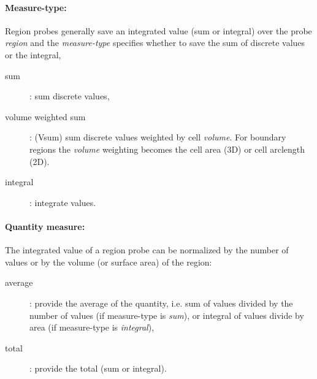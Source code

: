 \paragraph{Measure-type:} Region probes generally save an integrated value (sum or integral) over the probe {\em region} and
the {\em measure-type} specifies whether to save the sum of discrete values or the integral,
\begin{description}
   \item[\quad sum] : sum discrete values, 
   \item[\quad volume weighted sum] : (Vsum) sum discrete values weighted by cell {\em volume}. For boundary
    regions the {\em volume} weighting becomes the cell area (3D) or cell arclength (2D).
   \item[\quad integral] : integrate values.
\end{description}


\paragraph{Quantity measure:} The integrated value of a region probe can be normalized by the number of values or by
    the volume (or surface area) of the region:
\begin{description}
   \item[\quad average] : provide the average of the quantity, i.e. sum of values divided by the number of values (if measure-type is
 {\em sum}), or integral of values divide by area (if measure-type is {\em integral}), 
   \item[\quad total] : provide the total (sum or integral). 
\end{description}

